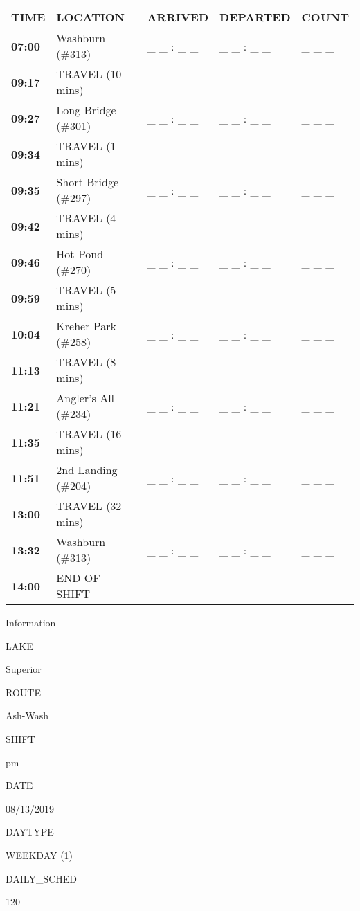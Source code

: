 \documentclass[]{article}
\begin{document}
\begin{tabular}{>{\bfseries}lllll}
\toprule
\textbf{TIME} & \textbf{LOCATION} & \textbf{ARRIVED} & \textbf{DEPARTED} & \textbf{COUNT}\\
\midrule
07:00 & Washburn (\#313) & \_ \_ : \_ \_ & \_ \_ : \_ \_ & \_ \_ \_\\
09:17 & TRAVEL (10 mins) &  &  & \\
09:27 & Long Bridge (\#301) & \_ \_ : \_ \_ & \_ \_ : \_ \_ & \_ \_ \_\\
09:34 & TRAVEL (1 mins) &  &  & \\
09:35 & Short Bridge (\#297) & \_ \_ : \_ \_ & \_ \_ : \_ \_ & \_ \_ \_\\
09:42 & TRAVEL (4 mins) &  &  & \\
09:46 & Hot Pond (\#270) & \_ \_ : \_ \_ & \_ \_ : \_ \_ & \_ \_ \_\\
09:59 & TRAVEL (5 mins) &  &  & \\
10:04 & Kreher Park (\#258) & \_ \_ : \_ \_ & \_ \_ : \_ \_ & \_ \_ \_\\
11:13 & TRAVEL (8 mins) &  &  & \\
11:21 & Angler's All (\#234) & \_ \_ : \_ \_ & \_ \_ : \_ \_ & \_ \_ \_\\
11:35 & TRAVEL (16 mins) &  &  & \\
11:51 & 2nd Landing (\#204) & \_ \_ : \_ \_ & \_ \_ : \_ \_ & \_ \_ \_\\
13:00 & TRAVEL (32 mins) &  &  & \\
13:32 & Washburn (\#313) & \_ \_ : \_ \_ & \_ \_ : \_ \_ & \_ \_ \_\\
14:00 & END OF SHIFT &  &  & \\
\bottomrule
\end{tabular}\newpage

Information

LAKE

Superior

ROUTE

Ash-Wash

SHIFT

pm

DATE

08/13/2019

DAYTYPE

WEEKDAY (1)

DAILY\_SCHED

120

\vspace{24pt}
\end{document}
